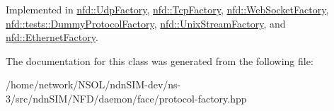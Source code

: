 Implemented in \hyperlink{classnfd_1_1UdpFactory_af218bef7aaec0a3e2d84b5ce013e71dd}{nfd\+::\+Udp\+Factory}, \hyperlink{classnfd_1_1TcpFactory_adae42421216ea295e35ef9177d0fe95f}{nfd\+::\+Tcp\+Factory}, \hyperlink{classnfd_1_1WebSocketFactory_a897429d95c0b5cde2744bc8e9ae5749b}{nfd\+::\+Web\+Socket\+Factory}, \hyperlink{classnfd_1_1tests_1_1DummyProtocolFactory_af5e5941643b9910c8e07f14112367dc2}{nfd\+::tests\+::\+Dummy\+Protocol\+Factory}, \hyperlink{classnfd_1_1UnixStreamFactory_a2f01d594f9aa3da8307e2f1a4f77094f}{nfd\+::\+Unix\+Stream\+Factory}, and \hyperlink{classnfd_1_1EthernetFactory_a6e89157070fdaad6cccbb43a15e5d730}{nfd\+::\+Ethernet\+Factory}.



The documentation for this class was generated from the following file\+:\begin{DoxyCompactItemize}
\item 
/home/network/\+N\+S\+O\+L/ndn\+S\+I\+M-\/dev/ns-\/3/src/ndn\+S\+I\+M/\+N\+F\+D/daemon/face/protocol-\/factory.\+hpp\end{DoxyCompactItemize}
